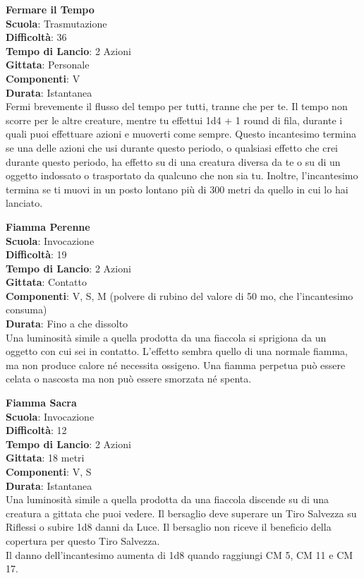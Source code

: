 \begin{multicols}{2}
\medskip\textbf{Fermare il Tempo}\\
\textbf{Scuola}: Trasmutazione\\
\textbf{Difficoltà}: 36\\
\textbf{Tempo di Lancio}: 2 Azioni\\
\textbf{Gittata}: Personale\\
\textbf{Componenti}: V\\
\textbf{Durata}: Istantanea\\
Fermi brevemente il flusso del tempo per tutti, tranne che per te. Il tempo non scorre per le altre creature, mentre tu effettui 1d4 + 1 round di fila, durante i quali puoi effettuare azioni e muoverti come sempre. Questo incantesimo termina se una delle azioni che usi durante questo periodo, o qualsiasi effetto che crei durante questo periodo, ha effetto su di una creatura diversa da te o su di un oggetto indossato o trasportato da qualcuno che non sia tu. Inoltre, l'incantesimo termina se ti muovi in un posto lontano più di 300 metri da quello in cui lo hai lanciato.

\medskip\textbf{Fiamma Perenne}\\
\textbf{Scuola}: Invocazione\\
\textbf{Difficoltà}: 19\\
\textbf{Tempo di Lancio}: 2 Azioni\\
\textbf{Gittata}: Contatto\\
\textbf{Componenti}: V, S, M (polvere di rubino del valore di 50 mo, che l'incantesimo consuma)\\ \textbf{Durata}: Fino a che dissolto\\
Una luminosità simile a quella prodotta da una fiaccola si sprigiona da un oggetto con cui sei in contatto. L'effetto sembra quello di una normale fiamma, ma non produce calore né necessita ossigeno. Una fiamma perpetua può essere celata o nascosta ma non può essere smorzata né spenta.

\medskip\textbf{Fiamma Sacra}\\
\textbf{Scuola}: Invocazione\\
\textbf{Difficoltà}: 12\\
\textbf{Tempo di Lancio}: 2 Azioni\\
\textbf{Gittata}: 18 metri\\
\textbf{Componenti}: V, S\\
\textbf{Durata}: Istantanea\\
Una luminosità simile a quella prodotta da una fiaccola discende su di una creatura a gittata che puoi vedere. Il bersaglio deve superare un Tiro Salvezza su Riflessi o subire 1d8 danni da Luce. Il bersaglio non riceve il beneficio della copertura per questo Tiro Salvezza.\\
Il danno dell'incantesimo aumenta di 1d8 quando raggiungi CM 5, CM 11 e CM 17.


\end{multicols}
